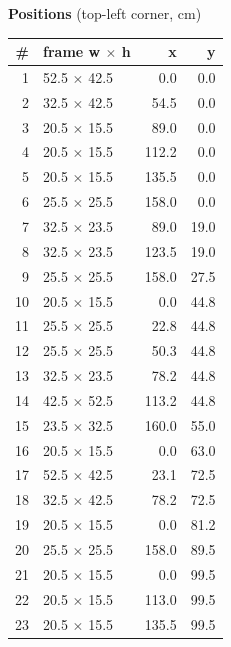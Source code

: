 \documentclass[a4paper,landscape,10pt]{article}
\begin{document}
\begin{minipage}[t]{0.25\textwidth}
\vspace{8pt}
{\bfseries Positions} (top-left corner, cm)\\[2pt]
\tiny
\begin{tabular}{@{}r l r r@{}}
\toprule
\# & frame w $\times$ h & x & y \\
\midrule
1 & 52.5 $\times$ 42.5 & 0.0 & 0.0 \\
2 & 32.5 $\times$ 42.5 & 54.5 & 0.0 \\
3 & 20.5 $\times$ 15.5 & 89.0 & 0.0 \\
4 & 20.5 $\times$ 15.5 & 112.2 & 0.0 \\
5 & 20.5 $\times$ 15.5 & 135.5 & 0.0 \\
6 & 25.5 $\times$ 25.5 & 158.0 & 0.0 \\
7 & 32.5 $\times$ 23.5 & 89.0 & 19.0 \\
8 & 32.5 $\times$ 23.5 & 123.5 & 19.0 \\
9 & 25.5 $\times$ 25.5 & 158.0 & 27.5 \\
10 & 20.5 $\times$ 15.5 & 0.0 & 44.8 \\
11 & 25.5 $\times$ 25.5 & 22.8 & 44.8 \\
12 & 25.5 $\times$ 25.5 & 50.3 & 44.8 \\
13 & 32.5 $\times$ 23.5 & 78.2 & 44.8 \\
14 & 42.5 $\times$ 52.5 & 113.2 & 44.8 \\
15 & 23.5 $\times$ 32.5 & 160.0 & 55.0 \\
16 & 20.5 $\times$ 15.5 & 0.0 & 63.0 \\
17 & 52.5 $\times$ 42.5 & 23.1 & 72.5 \\
18 & 32.5 $\times$ 42.5 & 78.2 & 72.5 \\
19 & 20.5 $\times$ 15.5 & 0.0 & 81.2 \\
20 & 25.5 $\times$ 25.5 & 158.0 & 89.5 \\
21 & 20.5 $\times$ 15.5 & 0.0 & 99.5 \\
22 & 20.5 $\times$ 15.5 & 113.0 & 99.5 \\
23 & 20.5 $\times$ 15.5 & 135.5 & 99.5 \\
\bottomrule
\end{tabular}
\end{minipage}
\clearpage
\end{document}
